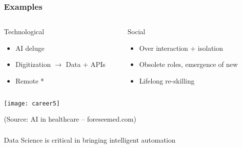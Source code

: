 \begin{frame}[fragile]\frametitle{Examples}
\begin{columns}
    \begin{column}[T]{0.5\linewidth}
			Technological
      \begin{itemize}
			\item AI deluge
			\item Digitization $\rightarrow$ Data + APIs
			\item Remote *
			\end{itemize}
    \end{column}
    \begin{column}[T]{0.5\linewidth}
			Social
      \begin{itemize}
			\item Over interaction + isolation
			\item Obsolete roles, emergence of new
			\item Lifelong re-skilling
			\end{itemize}		
    \end{column}
  \end{columns}
	
	\begin{center}
\texttt{[image: career5]}
\end{center}

{\tiny (Source: AI in healthcare – foreseemed.com)}

\end{frame}

	



\begin{frame}[fragile]\frametitle{}
\begin{center}
{\Large Data Science is critical in bringing intelligent automation}
\end{center}
\end{frame}


